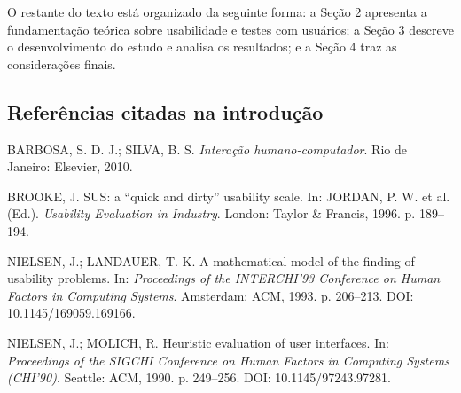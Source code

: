 \documentclass[a4paper,12pt]{article}
\begin{document}
O restante do texto está organizado da seguinte forma: a Seção 2
apresenta a fundamentação teórica sobre usabilidade e testes com
usuários; a Seção 3 descreve o desenvolvimento do estudo e analisa os
resultados; e a Seção 4 traz as considerações finais.

\subsection*{Referências citadas na introdução}

{\small
BARBOSA, S. D. J.; SILVA, B. S. \emph{Interação humano-computador}. Rio de Janeiro: Elsevier, 2010.

BROOKE, J. SUS: a ``quick and dirty'' usability scale. In: JORDAN, P. W. et al. (Ed.). \emph{Usability Evaluation in Industry}. London: Taylor \& Francis, 1996. p. 189--194.

NIELSEN, J.; LANDAUER, T. K. A mathematical model of the finding of usability problems. In: \emph{Proceedings of the INTERCHI'93 Conference on Human Factors in Computing Systems}. Amsterdam: ACM, 1993. p. 206--213. DOI: 10.1145/169059.169166.

NIELSEN, J.; MOLICH, R. Heuristic evaluation of user interfaces. In: \emph{Proceedings of the SIGCHI Conference on Human Factors in Computing Systems (CHI'90)}. Seattle: ACM, 1990. p. 249--256. DOI: 10.1145/97243.97281.
}
\end{document}
